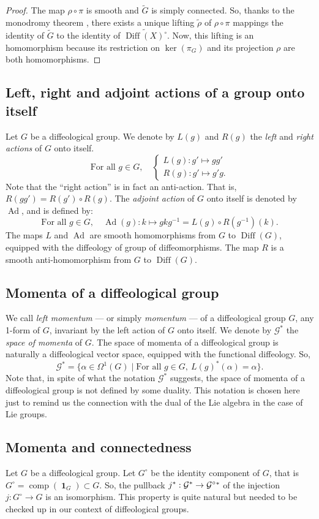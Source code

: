 \documentclass[10pt,reqno,twoside]{amsart}
\newcommand{\cG}{\mathcal{G}}
\DeclareMathOperator{\id}{\mathbf{1}}
\DeclareMathOperator{\Diff}{Diff}
\DeclareMathOperator{\Ad}{Ad}
\DeclareMathOperator{\comp}{comp}
\newcommand{\R}{R}
\renewcommand{\L}{L}
\theoremstyle{plain}
\theoremstyle{definition}
\newcommand{\article}[1]{\subsection{#1}}
\begin{document}
  \begin{proof}
    The map $\rho \circ \pi$ is smooth and $\widetilde G$ is simply connected.
    So,
    thanks to the monodromy theorem \cite{Igl85},
    there exists a unique lifting $\tilde \rho$ of $\rho \circ \pi$ mappings the identity of $\tilde G$ to the identity of $\widetilde{ \Diff(X)^\circ}$.
    Now,
    this lifting is an homomorphism because its restriction on $\ker(\pi_G)$ and its projection $\rho$ are both homomorphisms.
  \end{proof}
  
  \article{Left, right and adjoint actions of a group onto itself}
  \label{Left-right-and-adjoint-actions-of-a-group-onto-itself}
  Let $G$ be a diffeological group.
  We denote by $\L(g)$ and $\R(g)$ the {\em left} and {\em right actions} of $G$ onto itself.
  $$ \mbox{For all } g \in G, \quad \left\{
    \begin{array}{l}
    {\L(g)} : g' \mapsto gg' \\
    {\R(g)} : g' \mapsto g'g.
    \end{array}
    \right.
    $$
  Note that the ``right action'' is in fact an anti-action.
  That is,
  $\R(gg') = \R(g') \circ \R(g)$.
  The {\em adjoint action} of $G$ onto itself is denoted by $\Ad$,
  and is defined by:
  $$ \mbox{For all } g \in G, \quad \Ad(g):k \mapsto gkg^{-1} = \L(g) \circ \R(g^{-1})(k).
    $$
  The maps $\L$ and $\Ad$ are smooth homomorphisms from $G$ to $\Diff(G)$,
  equipped with the diffeology of group of diffeomorphisms.
  The map $\R$ is a smooth anti-homomorphism from $G$ to $\Diff(G)$.
  
  \article{Momenta of a diffeological group}
  \label{Momenta-of-a-diffeological-group}
  We call {\em left momentum}
  --- or simply {\em momentum} ---
  of a diffeological group $G$,
  any 1-form of $G$,
  invariant by the left action of $G$ onto itself.
  We denote by $\cG^*$ the {\em space of momenta} of $G$.
  The space of momenta of a diffeological group is naturally a diffeological vector space,
  equipped with the functional diffeology.
  So,
  $$ \cG^* = \{ \alpha \in \Omega^1(G) \mid \mbox{For all } g \in G, \ \L(g)^*(\alpha) = \alpha \}.
    $$
  Note that,
  in spite of what the notation $\cG^*$ suggests,
  the space of momenta of a diffeological group is not defined by some duality.
  This notation is chosen here just to remind us the connection with the dual of the Lie algebra in the case of Lie groups.
  
  \article{Momenta and connectedness}
  \label{Momenta-and-connectedness}
  Let $G$ be a diffeological group.
  Let $G^\circ$ be the identity component of $G$,
  that is $G^\circ = \comp(\id_G) \subset G$.
  So,
  the pullback $j^* : \cG^* \to {\cG^\circ}^{\raisebox{-3.2pt}{\scriptsize *}}$ of the injection $j : G^\circ \to G$ is an isomorphism.
  This property is quite natural but needed to be checked up in our context of diffeological groups.
  
\end{document}
